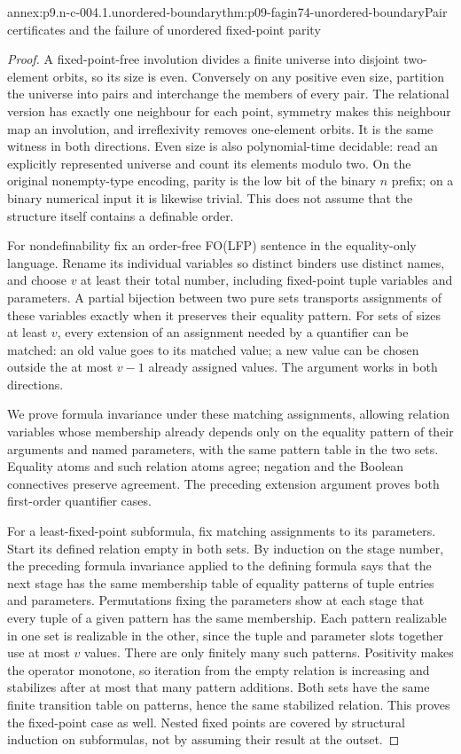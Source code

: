 \begin{annexitem}{annex:p9.n-c-004.1.unordered-boundary}{thm:p09-fagin74-unordered-boundary}{Pair certificates and the failure of unordered fixed-point parity}
\begin{proof}
A fixed-point-free involution divides a finite universe into disjoint
two-element orbits, so its size is even.  Conversely on any positive even
size, partition the universe into pairs and interchange the members of every
pair.  The relational version has exactly one neighbour for each point,
symmetry makes this neighbour map an involution, and irreflexivity removes
one-element orbits.  It is the same witness in both directions.  Even size
is also polynomial-time decidable: read an explicitly represented universe
and count its elements modulo two.  On the original nonempty-type encoding,
parity is the low bit of the binary \(n\) prefix; on a binary numerical
input it is likewise trivial.  This does not assume that the structure itself
contains a definable order.

For nondefinability fix an order-free FO(LFP) sentence in the equality-only
language.  Rename its individual variables so distinct binders use distinct
names, and choose \(v\) at least their total number, including fixed-point
tuple variables and parameters.  A partial bijection between two pure sets
transports assignments of these variables exactly when it preserves their
equality pattern.  For sets of sizes at least \(v\), every extension of an
assignment needed by a quantifier can be matched: an old value goes to its
matched value; a new value can be chosen outside the at most \(v-1\)
already assigned values.  The argument works in both directions.

We prove formula invariance under these matching assignments, allowing
relation variables whose membership already depends only on the equality
pattern of their arguments and named parameters, with the same pattern
table in the two sets.  Equality atoms and such relation atoms agree;
negation and the Boolean connectives preserve agreement.  The preceding
extension argument proves both first-order quantifier cases.

For a least-fixed-point subformula, fix matching assignments to its
parameters.  Start its defined relation empty in both sets.  By induction on
the stage number, the preceding formula invariance applied to the defining
formula says that the next stage has the same membership table of equality
patterns of tuple entries and parameters.  Permutations fixing the parameters
show at each stage that every tuple of a given pattern has the same membership.
Each pattern realizable in one set is realizable in the other, since the
tuple and parameter slots together use at most \(v\) values.  There are
only finitely many such patterns.  Positivity makes the operator monotone,
so iteration from the empty relation is increasing and stabilizes after at
most that many pattern additions.  Both sets have the same finite transition
table on patterns, hence the same stabilized relation.  This proves the
fixed-point case as well.  Nested fixed points are covered by structural
induction on subformulas, not by assuming their result at the outset.


\end{proof}
\end{annexitem}
